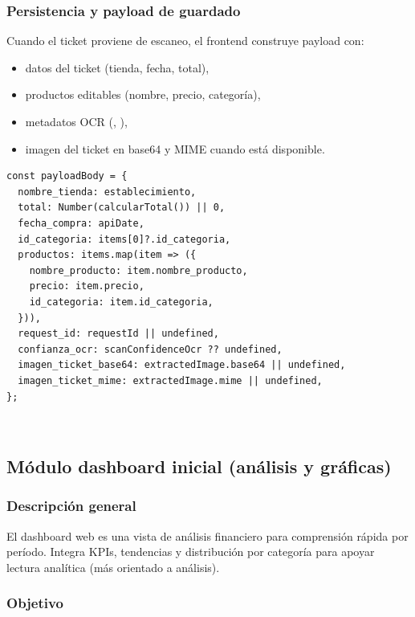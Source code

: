 \subsubsection{Persistencia y payload de guardado}

Cuando el ticket proviene de escaneo, el frontend construye payload con:
\begin{itemize}
  \item datos del ticket (tienda, fecha, total),
  \item productos editables (nombre, precio, categoría),
  \item metadatos OCR (, ),
  \item imagen del ticket en base64 y MIME cuando está disponible.
\end{itemize}

\begin{lstlisting}[style=codigobase,
    caption={Guardado final de ticket escaneado (flujo web)}]
const payloadBody = {
  nombre_tienda: establecimiento,
  total: Number(calcularTotal()) || 0,
  fecha_compra: apiDate,
  id_categoria: items[0]?.id_categoria,
  productos: items.map(item => ({
    nombre_producto: item.nombre_producto,
    precio: item.precio,
    id_categoria: item.id_categoria,
  })),
  request_id: requestId || undefined,
  confianza_ocr: scanConfidenceOcr ?? undefined,
  imagen_ticket_base64: extractedImage.base64 || undefined,
  imagen_ticket_mime: extractedImage.mime || undefined,
};
\end{lstlisting}

\
\subsection{Módulo dashboard inicial (análisis y gráficas)}

\subsubsection{Descripción general}

El dashboard web es una vista de análisis financiero para comprensión rápida
por período. Integra KPIs, tendencias y distribución por categoría
para apoyar lectura analítica (más orientado a análisis).

\subsubsection{Objetivo}


